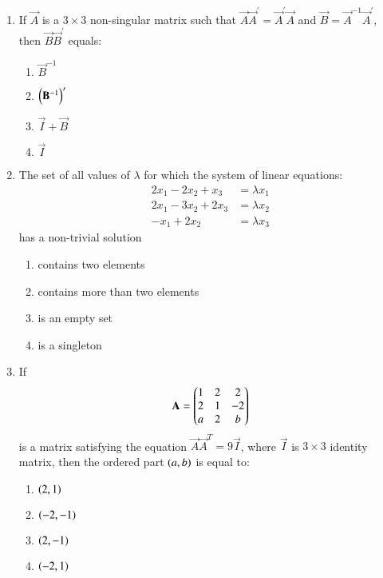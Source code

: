 \documentclass[journal,onecolumn]{IEEEtran}
\theoremstyle{remark}
\begin{document}
\begin{enumerate}
	\item If $\vec{A}$ is a $3\times3$ non-singular matrix such that $\vec{A}\vec{A}^{\prime}=\vec{A}^{\prime}\vec{A}$ and $\vec{B}=\vec{A}^{-1}\vec{A}^{\prime}$, then $\vec{B}\vec{B}^{\prime}$ equals:
	\hfill {}{\par}
	\begin{enumerate}
	    	\item $\vec{B}^{-1}$
		\item $\left(\mathbf{B}^{-1}\right)^{\prime}$
		\item $\vec{I}+\vec{B}$ 
		\item $\vec{I}$
        \end{enumerate}


    \item The set of all values of $\lambda$ for which the system of linear equations:
	\begin{align*}
		2x_1-2x_2+x_3 &= \lambda x_1\\
		2x_1-3x_2+2x_3 &= \lambda x_2\\
		-x_1+2x_2 &= \lambda x_3
	\end{align*}
	has a non-trivial solution

	\hfill{}
	\begin{enumerate}
		\item contains two elements
		\item contains more than two elements
		\item is an empty set
		\item is a singleton
	\end{enumerate}


	\item If \begin{align*} \mathbf{A} = \begin{pmatrix}1&2&2\\2&1&-2\\a&2&b\end{pmatrix} \end{align*} is a matrix satisfying the equation $\vec{A}\vec{A}^T = 9\vec{I}$, where $\vec{I}$ is $3\times3$ identity matrix, then the ordered part $\left(a,b\right)$ is equal to:
	\hfill {}{\par}
	\begin{enumerate}
	    	\item $\left(2,1\right)$ 
	    	\item $\left(-2,-1\right)$ 
	    	\item $\left(2,-1\right)$ 
	   	\item $\left(-2,1\right)$ 
	\end{enumerate}



\end{enumerate}
\end{document}
